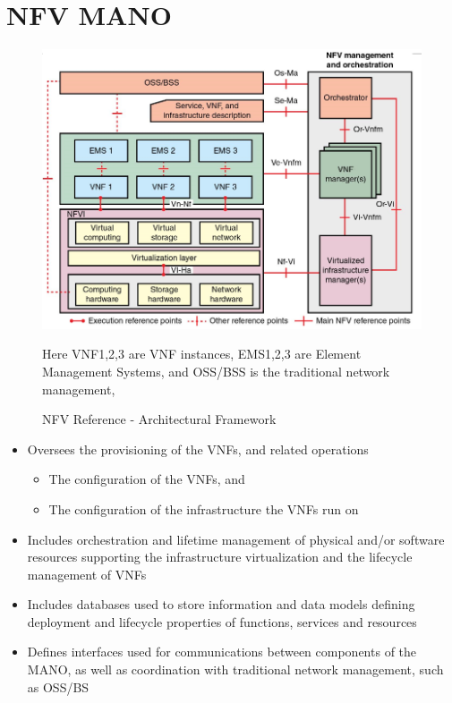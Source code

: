 \section{NFV MANO}

\begin{figure}[htbp]
   \centering
   \includegraphics{images/NFV_mano.png}
   \caption{NFV Reference - Architectural Framework}
   Here VNF1,2,3 are VNF instances, EMS1,2,3 are Element Management Systems, and OSS/BSS is the traditional network management,
   \label{fig:NFV_mano}
\end{figure}

\begin{itemize}
   \item Oversees the provisioning of the VNFs,
   and related operations
   \begin{itemize}
      \item The configuration of the VNFs, and
      \item The configuration of the infrastructure the VNFs run on
   \end{itemize}
   \item Includes orchestration and lifetime management of physical and/or software resources supporting the infrastructure virtualization and the lifecycle management of VNFs
   \item Includes databases used to store information and data models defining deployment and lifecycle properties of functions, services and resources
   \item Defines interfaces used for communications between components of the MANO, as well as coordination with traditional network management, such as OSS/BS
\end{itemize}

